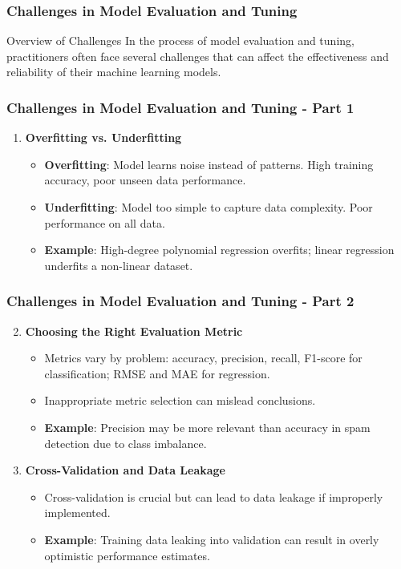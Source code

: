 \documentclass[aspectratio=169]{beamer}
\begin{document}
\begin{frame}[fragile]
    \frametitle{Challenges in Model Evaluation and Tuning}
    \begin{block}{Overview of Challenges}
        In the process of model evaluation and tuning, practitioners often face several challenges that can affect the effectiveness and reliability of their machine learning models.
    \end{block}
\end{frame}

\begin{frame}[fragile]
    \frametitle{Challenges in Model Evaluation and Tuning - Part 1}
    \begin{enumerate}
        \item \textbf{Overfitting vs. Underfitting}
        \begin{itemize}
            \item \textbf{Overfitting}: Model learns noise instead of patterns. High training accuracy, poor unseen data performance.
            \item \textbf{Underfitting}: Model too simple to capture data complexity. Poor performance on all data.
            \item \textbf{Example}: High-degree polynomial regression overfits; linear regression underfits a non-linear dataset.
        \end{itemize}
    \end{enumerate}
\end{frame}

\begin{frame}[fragile]
    \frametitle{Challenges in Model Evaluation and Tuning - Part 2}
    \begin{enumerate}
        \setcounter{enumi}{1}
        \item \textbf{Choosing the Right Evaluation Metric}
        \begin{itemize}
            \item Metrics vary by problem: accuracy, precision, recall, F1-score for classification; RMSE and MAE for regression.
            \item Inappropriate metric selection can mislead conclusions.
            \item \textbf{Example}: Precision may be more relevant than accuracy in spam detection due to class imbalance.
        \end{itemize}

        \item \textbf{Cross-Validation and Data Leakage}
        \begin{itemize}
            \item Cross-validation is crucial but can lead to data leakage if improperly implemented.
            \item \textbf{Example}: Training data leaking into validation can result in overly optimistic performance estimates.
        \end{itemize}
    \end{enumerate}
\end{frame}
\end{document}
